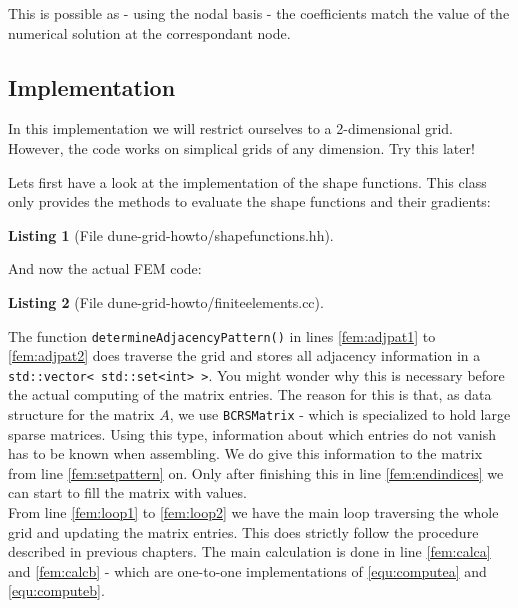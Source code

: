 \documentclass[11pt,a4paper,headinclude,footinclude,DIV16,normalheadings]{scrreprt}
\newtheorem{lst}{Listing}
\begin{document}
This is possible as - using the nodal basis - the coefficients match the value of the numerical solution at the correspondant node.

\subsection{Implementation}

In this implementation we will restrict ourselves to a 2-dimensional grid. However, the code works on simplical grids of any dimension. Try this later!

Lets first have a look at the implementation of the shape functions. This class only provides the methods to evaluate the shape functions and their gradients:

\begin{lst}[File dune-grid-howto/shapefunctions.hh] \mbox{}
\nopagebreak

\end{lst}

And now the actual FEM code:

\begin{lst}[File dune-grid-howto/finiteelements.cc] \mbox{}
\nopagebreak

\end{lst}

The function \lstinline!determineAdjacencyPattern()! in lines \ref{fem:adjpat1} to \ref{fem:adjpat2} does traverse the grid and stores all adjacency information in a \lstinline!std::vector< std::set<int> >!. You might wonder why this is necessary before the actual computing of the matrix entries. The reason for this is that, as data structure for the matrix $A$, we use \lstinline!BCRSMatrix! - which is specialized to hold large sparse matrices. Using this type, information about which entries do not vanish has to be known when assembling. We do give this information to the matrix from line \ref{fem:setpattern} on. Only after finishing this in line \ref{fem:endindices} we can start to fill the matrix with values. \\

From line \ref{fem:loop1} to \ref{fem:loop2} we have the main loop traversing the whole grid and updating the matrix entries. This does strictly follow the procedure described in previous chapters. The main calculation is done in line \ref{fem:calca} and \ref{fem:calcb} - which are one-to-one implementations of \ref{equ:computea} and \ref{equ:computeb}. \\
\end{document}
